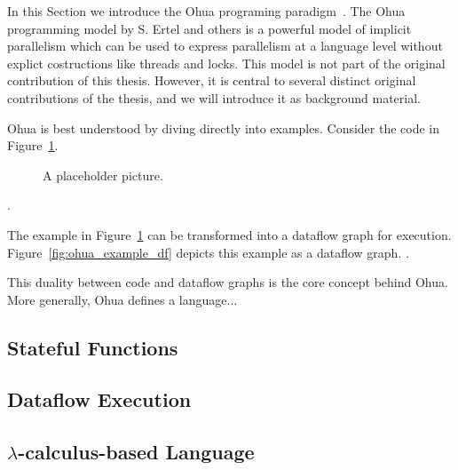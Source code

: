 In this Section we introduce the Ohua programing paradigm~\cite{ertel_phdthesis}.
The Ohua programming model by S. Ertel and others is a powerful model of implicit parallelism which can be used to express parallelism at a language level without explict costructions like threads and locks. 
This model is not part of the original contribution of this thesis. However, it is central to several distinct original contributions of the thesis, and we will introduce it as background material.

Ohua is best understood by diving directly into examples. Consider the code in Figure~\ref{fig:ohua_example}.
\begin{figure}[h]
	\centering
   \resizebox{0.55\textwidth}{!}{}
	\caption{A placeholder picture.}
	\label{fig:ohua_example}
\end{figure}

.

The example in Figure~\ref{fig:ohua_example} can be transformed into a dataflow graph for execution. Figure~\ref{fig:ohua_example_df} depicts this example as a dataflow graph.
.

This duality between code and dataflow graphs is the core concept behind Ohua. More generally, Ohua defines a language...

\subsection{Stateful Functions}

\subsection{Dataflow Execution}

\subsection{$\lambda$-calculus-based Language}
